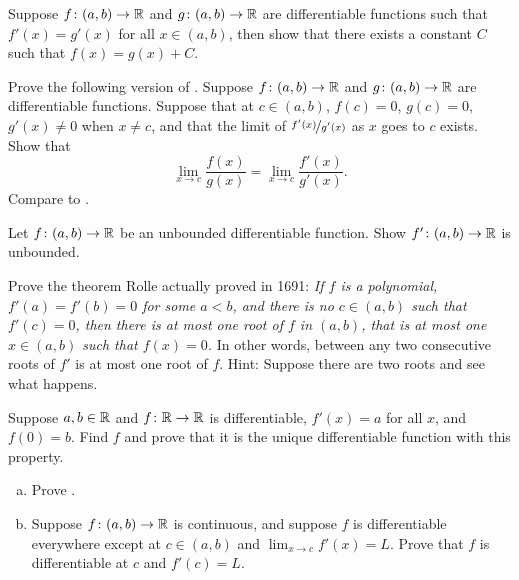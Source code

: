 \begin{exercise} \label{exercise:samediffconst}
Suppose $f \colon (a,b) \to {\mathbb{R}}$ and $g \colon (a,b) \to {\mathbb{R}}$ are
differentiable functions such that $f'(x) = g'(x)$ for all $x \in (a,b)$,
then show that there exists a constant $C$ such that $f(x) = g(x) + C$.
\end{exercise}

\begin{exercise}
Prove the following version of .
Suppose 
$f \colon (a,b) \to {\mathbb{R}}$ and $g \colon (a,b) \to {\mathbb{R}}$ are differentiable
functions.  Suppose that at $c \in (a,b)$, $f(c) = 0$, $g(c)=0$,
$g'(x) \not= 0$ when $x \not= c$, and
that the limit of $\nicefrac{f'(x)}{g'(x)}$ as $x$ goes to $c$ exists.  Show that
\begin{equation*}
\lim_{x \to c} \frac{f(x)}{g(x)} = 
\lim_{x \to c} \frac{f'(x)}{g'(x)} .
\end{equation*}
Compare to .
\end{exercise}

\begin{exercise}
Let $f \colon (a,b) \to {\mathbb{R}}$ be an unbounded differentiable function.  Show
$f' \colon (a,b) \to {\mathbb{R}}$ is unbounded.
\end{exercise}

\begin{exercise}
Prove the theorem Rolle actually proved in 1691:
\emph{If $f$ is a polynomial,
$f'(a) = f'(b) = 0$ for some $a < b$,
and there is no $c \in (a,b)$ such that $f'(c) = 0$,
then there is at most one root of $f$ in $(a,b)$,
that is at most one $x \in (a,b)$ such that $f(x) = 0$.}
In other words, between any two consecutive roots of $f'$ is at most one
root of $f$.
Hint: Suppose there are two roots and see what happens.
\end{exercise}

\begin{exercise}
Suppose $a,b \in {\mathbb{R}}$ and $f \colon {\mathbb{R}} \to {\mathbb{R}}$ is differentiable,
$f'(x) = a$ for all $x$, and $f(0) = b$.  Find $f$ and prove that 
it is the unique differentiable function with this property.
\end{exercise}

\begin{exercise} \label{exercise:endpointderivative}
\leavevmode
\begin{enumerate}[a)]
\item
Prove .
\item 
Suppose $f \colon (a,b) \to {\mathbb{R}}$ is continuous, and suppose $f$ is differentiable everywhere except at $c \in
(a,b)$ and $\lim_{x \to c} f'(x) = L$.
Prove that $f$ is differentiable at
$c$ and $f'(c) = L$.
\end{enumerate}
\end{exercise}

